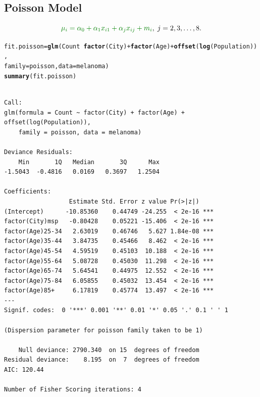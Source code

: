 \documentclass{article}\usepackage[]{graphicx}\usepackage[svgnames]{xcolor}
\makeatletter
\newcommand{\hlopt}[1]{\textcolor[rgb]{0,0,0}{#1}}%
\newcommand{\hlstd}[1]{\textcolor[rgb]{0.345,0.345,0.345}{#1}}%
\newcommand{\hlkwb}[1]{\textcolor[rgb]{0.69,0.353,0.396}{#1}}%
\newcommand{\hlkwc}[1]{\textcolor[rgb]{0.333,0.667,0.333}{#1}}%
\newcommand{\hlkwd}[1]{\textcolor[rgb]{0.737,0.353,0.396}{\textbf{#1}}}%
\newenvironment{kframe}{%
 \def\at@end@of@kframe{}%
 \ifinner\ifhmode%
  \def\at@end@of@kframe{\end{minipage}}%
  \begin{minipage}{\columnwidth}%
 \fi\fi%
 \def\FrameCommand##1{\hskip\@totalleftmargin \hskip-\fboxsep
 \colorbox{shadecolor}{##1}\hskip-\fboxsep
     \hskip-\linewidth \hskip-\@totalleftmargin \hskip\columnwidth}%
 \MakeFramed {\advance\hsize-\width
   \@totalleftmargin\z@ \linewidth\hsize
   \@setminipage}}%
 {\par\unskip\endMakeFramed%
 \at@end@of@kframe}
\newenvironment{knitrout}{}{} %
\let\log\relax%
\makeatother
\begin{document}
\subsection*{Poisson Model}
\[ \textcolor{Green}{\log{\mu_i}=\alpha_0+\alpha_1x_{i1}+\alpha_jx_{ij}+\log{m_i}},\; j=2,3,\ldots,8. \]
\begin{knitrout}
\color{fgcolor}\begin{kframe}
\begin{alltt}
\hlstd{fit.poisson} \hlkwb{=} \hlkwd{glm}\hlstd{(Count} \hlopt{~} \hlkwd{factor}\hlstd{(City)} \hlopt{+} \hlkwd{factor}\hlstd{(Age)} \hlopt{+} \hlkwd{offset}\hlstd{(}\hlkwd{log}\hlstd{(Population)),}
  \hlkwc{family} \hlstd{= poisson,} \hlkwc{data} \hlstd{= melanoma)}
\hlkwd{summary}\hlstd{(fit.poisson)}
\end{alltt}
\begin{verbatim}

Call:
glm(formula = Count ~ factor(City) + factor(Age) + offset(log(Population)), 
    family = poisson, data = melanoma)

Deviance Residuals: 
    Min       1Q   Median       3Q      Max  
-1.5043  -0.4816   0.0169   0.3697   1.2504  

Coefficients:
                  Estimate Std. Error z value Pr(>|z|)    
(Intercept)      -10.85360    0.44749 -24.255  < 2e-16 ***
factor(City)msp   -0.80428    0.05221 -15.406  < 2e-16 ***
factor(Age)25-34   2.63019    0.46746   5.627 1.84e-08 ***
factor(Age)35-44   3.84735    0.45466   8.462  < 2e-16 ***
factor(Age)45-54   4.59519    0.45103  10.188  < 2e-16 ***
factor(Age)55-64   5.08728    0.45030  11.298  < 2e-16 ***
factor(Age)65-74   5.64541    0.44975  12.552  < 2e-16 ***
factor(Age)75-84   6.05855    0.45032  13.454  < 2e-16 ***
factor(Age)85+     6.17819    0.45774  13.497  < 2e-16 ***
---
Signif. codes:  0 '***' 0.001 '**' 0.01 '*' 0.05 '.' 0.1 ' ' 1

(Dispersion parameter for poisson family taken to be 1)

    Null deviance: 2790.340  on 15  degrees of freedom
Residual deviance:    8.195  on  7  degrees of freedom
AIC: 120.44

Number of Fisher Scoring iterations: 4
\end{verbatim}
\end{kframe}
\end{knitrout}
\end{document}
